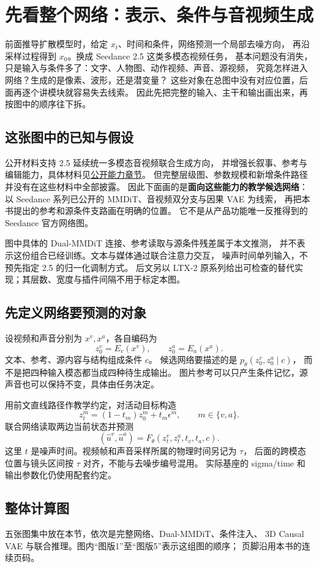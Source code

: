 \chapter{先看整个网络：表示、条件与音视频生成}
\label{seedance-architecture}

前面推导扩散模型时，给定 $x_t$、时间和条件，网络预测一个局部去噪方向，
再沿采样过程得到 $x_0$。换成 Seedance 2.5 这类多模态视频任务，
基本问题没有消失，只是输入与条件多了：文字、人物图、动作视频、声音、源视频，
究竟怎样进入网络？生成的是像素、波形，还是潜变量？
这些对象在总图中没有对应位置，后面再逐个讲模块就容易失去线索。
因此先把完整的输入、主干和输出画出来，再按图中的顺序往下拆。

\section{这张图中的已知与假设}
公开材料支持 2.5 延续统一多模态音视频联合生成方向，
并增强长叙事、参考与编辑能力，具体材料见\hyperref[seedance-m00]{公开能力章节}。
但完整层级图、参数规模和新增条件路径并没有在这些材料中全部披露。
因此下面画的是\textbf{面向这些能力的教学候选网络}：
以 Seedance 系列已公开的 MMDiT、音视频双分支与因果 VAE 为线索，
再把本书提出的参考和源条件支路画在明确的位置。
它不是从产品功能唯一反推得到的 Seedance 官方网络图。

图中具体的 Dual-MMDiT 连接、参考读取与源条件残差属于本文推测，
并不表示这份组合已经训练。文本与媒体通过联合注意力交互，
噪声时间单列输入，不预先指定 2.5 的归一化调制方式。
后文另以 LTX-2 原系列给出可检查的替代实现；其层数、宽度与插件间隔不用于标定本图。

\section{先定义网络要预测的对象}
设视频和声音分别为 $x^v,x^a$，各自编码为
\[
z_0^v=E_v(x^v),\qquad z_0^a=E_a(x^a).
\]
文本、参考、源内容与结构组成条件 $c$。
候选网络要描述的是 $p_\theta(z_0^v,z_0^a\mid c)$，
而不是把四种输入模态都当成四种待生成输出。
图片参考可以只产生条件记忆，源声音也可以保持不变，具体由任务决定。

用前文直线路径作教学约定，对活动目标构造
\[
z_t^m=(1-t_m)z_0^m+t_m\epsilon^m,\qquad m\in\{v,a\}.
\]
联合网络读取两边当前状态并预测
\[
(\hat u^v,\hat u^a)
=F_\theta(z_t^v,z_t^a,t_v,t_a,c).
\]
这里 $t$ 是噪声时间。视频帧和声音采样所属的物理时间另记为 $\tau$，
后面的跨模态位置与镜头区间按 $\tau$ 对齐，不能与去噪步编号混用。
实际基座的 sigma/time 和输出参数化仍使用配套约定。

\clearpage
\section{整体计算图}
五张图集中放在本节，依次是完整网络、Dual-MMDiT、条件注入、
3D Causal VAE 与联合推理。图内“图版1”至“图版5”表示这组图的顺序；
页脚沿用本书的连续页码。

